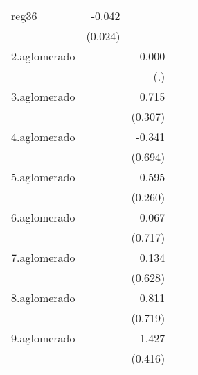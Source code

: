 {\begin{longtable}{l*{4}{D{.}{.}{-1}}}
\addlinespace
reg36       &      -0.042         &                     &                     &                     \\
            &     (0.024)         &                     &                     &                     \\
\addlinespace
2.aglomerado&                     &       0.000         &                     &                     \\
            &                     &         (.)         &                     &                     \\
\addlinespace
3.aglomerado&                     &       0.715\sym{*}  &                     &                     \\
            &                     &     (0.307)         &                     &                     \\
\addlinespace
4.aglomerado&                     &      -0.341         &                     &                     \\
            &                     &     (0.694)         &                     &                     \\
\addlinespace
5.aglomerado&                     &       0.595\sym{*}  &                     &                     \\
            &                     &     (0.260)         &                     &                     \\
\addlinespace
6.aglomerado&                     &      -0.067         &                     &                     \\
            &                     &     (0.717)         &                     &                     \\
\addlinespace
7.aglomerado&                     &       0.134         &                     &                     \\
            &                     &     (0.628)         &                     &                     \\
\addlinespace
8.aglomerado&                     &       0.811         &                     &                     \\
            &                     &     (0.719)         &                     &                     \\
\addlinespace
9.aglomerado&                     &       1.427\sym{***}&                     &                     \\
            &                     &     (0.416)         &                     &                     \\

\end{longtable}}
